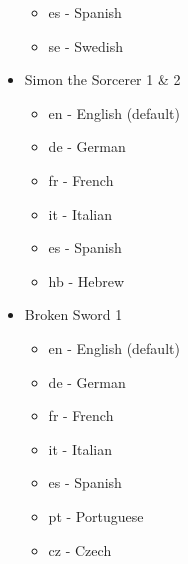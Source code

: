 \begin{itemize}
\begin{itemize}
  \item es  - Spanish
  \item se  - Swedish
  \end{itemize}
\item Simon the Sorcerer 1 \& 2
  \begin{itemize}
  \item en  - English (default)
  \item de  - German
  \item fr  - French
  \item it  - Italian
  \item es  - Spanish
  \item hb  - Hebrew
  \end{itemize}
\item Broken Sword 1
  \begin{itemize}
  \item en  - English (default)
  \item de  - German
  \item fr  - French
  \item it  - Italian
  \item es  - Spanish
  \item pt  - Portuguese
  \item cz  - Czech
  \end{itemize}
\end{itemize}